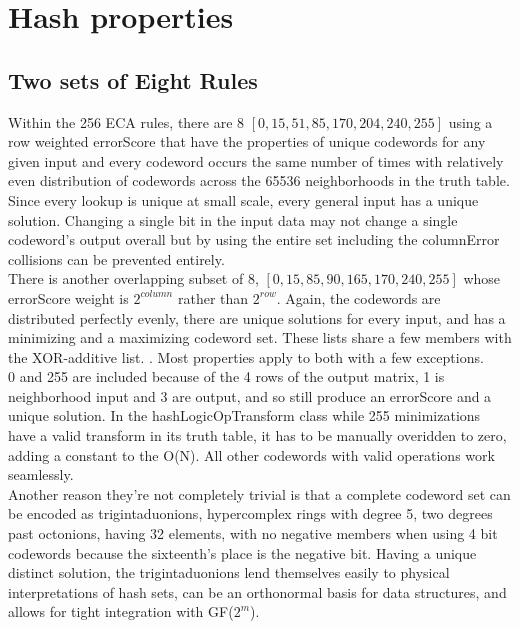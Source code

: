 \documentclass[11pt]{article}
\begin{document}
\section{Hash properties}



\subsection{Two sets of Eight Rules}
Within the 256 ECA rules, there are 8 $[0,15,51,85,170,204,240,255]$ using a row weighted errorScore that have the properties of unique codewords for any given input and every codeword occurs the same number of times with relatively even distribution of codewords across the 65536 neighborhoods in the truth table.  Since every lookup is unique at small scale, every general input has a unique solution. Changing a single bit in the input data may not change a single codeword's output overall but by using the entire set including the columnError collisions can be prevented entirely.\\

There is another overlapping subset of 8, $[0,15,85,90,165,170,240,255]$ whose errorScore weight is $2^{column}$ rather than $2^{row}$. Again, the codewords are distributed perfectly evenly, there are unique solutions for every input, and has a minimizing and a maximizing codeword set. These lists share a few members with the XOR-additive list. \cite{xorAdditive}. Most properties apply to both with a few exceptions.\\

0 and 255 are included because of the 4 rows of the output matrix, 1 is neighborhood input and 3 are output, and so still produce an errorScore and a unique solution. In the hashLogicOpTransform class while 255 minimizations have a valid transform in its truth table, it has to be manually overidden to zero, adding a constant to the O(N). All other codewords with valid operations work seamlessly. \\

Another reason they're not completely trivial is that a complete codeword set can be encoded as trigintaduonions, hypercomplex rings with degree 5, two degrees past octonions, having 32 elements, with no negative members when using 4 bit codewords because the sixteenth's place is the negative bit. Having a unique distinct solution, the trigintaduonions lend themselves easily to physical interpretations of hash sets, can be an orthonormal basis for data structures, and allows for tight integration with GF($2^m$).  \\
\end{document}
